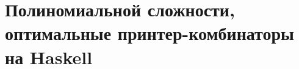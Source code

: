 \appendix

\section{Полиномиальной сложности, оптимальные принтер-комбинаторы на Haskell}
\label{app:1}


